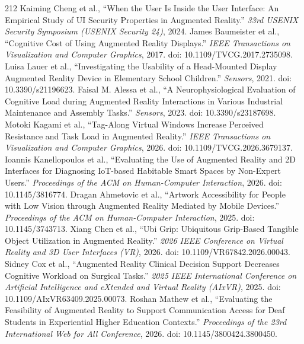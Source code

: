 \begin{thebibliography}{212}
 Kaiming Cheng et al., ``When the User Is Inside the User Interface: An Empirical Study of {UI} Security Properties in Augmented Reality.'' \emph{33rd USENIX Security Symposium (USENIX Security 24)}, 2024.
 James Baumeister et al., ``Cognitive Cost of Using Augmented Reality Displays.'' \emph{IEEE Transactions on Visualization and Computer Graphics}, 2017. doi: 10.1109/TVCG.2017.2735098.
 Luisa Lauer et al., ``Investigating the Usability of a Head-Mounted Display Augmented Reality Device in Elementary School Children.'' \emph{Sensors}, 2021. doi: 10.3390/s21196623.
 Faisal M. Alessa et al., ``A Neurophysiological Evaluation of Cognitive Load during Augmented Reality Interactions in Various Industrial Maintenance and Assembly Tasks.'' \emph{Sensors}, 2023. doi: 10.3390/s23187698.
 Motoki Kagami et al., ``Tag-Along Virtual Windows Increase Perceived Resistance and Task Load in Augmented Reality.'' \emph{IEEE Transactions on Visualization and Computer Graphics}, 2026. doi: 10.1109/TVCG.2026.3679137.
 Ioannis Kanellopoulos et al., ``Evaluating the Use of Augmented Reality and 2D Interfaces for Diagnosing IoT-based Habitable Smart Spaces by Non-Expert Users.'' \emph{Proceedings of the ACM on Human-Computer Interaction}, 2026. doi: 10.1145/3816774.
 Dragan Ahmetovic et al., ``Artwork Accessibility for People with Low Vision through Augmented Reality Mediated by Mobile Devices.'' \emph{Proceedings of the ACM on Human-Computer Interaction}, 2025. doi: 10.1145/3743713.
 Xiang Chen et al., ``Ubi Grip: Ubiquitous Grip-Based Tangible Object Utilization in Augmented Reality.'' \emph{2026 IEEE Conference on Virtual Reality and 3D User Interfaces (VR)}, 2026. doi: 10.1109/VR67842.2026.00043.
 Sidney Cox et al., ``Augmented Reality Clinical Decision Support Decreases Cognitive Workload on Surgical Tasks.'' \emph{2025 IEEE International Conference on Artificial Intelligence and eXtended and Virtual Reality (AIxVR)}, 2025. doi: 10.1109/AIxVR63409.2025.00073.
 Roshan Mathew et al., ``Evaluating the Feasibility of Augmented Reality to Support Communication Access for Deaf Students in Experiential Higher Education Contexts.'' \emph{Proceedings of the 23rd International Web for All Conference}, 2026. doi: 10.1145/3800424.3800450.

\end{thebibliography}
